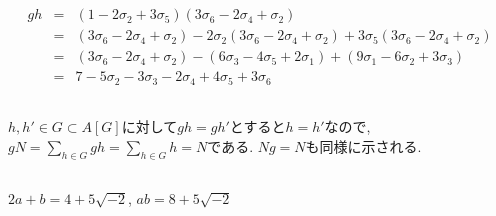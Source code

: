 \documentclass{jsarticle}
\begin{document}
\section{}

\subsection{} %
\begin{eqnarray*}
	gh 
	&=& (1 - 2\sigma_2 + 3\sigma_5)(3\sigma_6 - 2\sigma_4 + \sigma_2)\\
	&=& (3\sigma_6 - 2\sigma_4 + \sigma_2) - 2\sigma_2(3\sigma_6 - 2\sigma_4 + \sigma_2) + 3\sigma_5(3\sigma_6 - 2\sigma_4 + \sigma_2)\\
	&=& (3\sigma_6 - 2\sigma_4 + \sigma_2) - (6\sigma_3 - 4\sigma_5 + 2\sigma_1) + (9\sigma_1 - 6\sigma_2 + 3\sigma_3)\\
	&=& 7 - 5\sigma_2 - 3\sigma_3 - 2\sigma_4 + 4\sigma_5 + 3\sigma_6
\end{eqnarray*}

\subsection{} %
$h, h' \in G \subset A[G]$に対して$gh = gh'$とすると$h = h'$なので, $gN = \sum_{h \in G}gh = \sum_{h \in G}h = N$である. $Ng = N$も同様に示される.

\subsection{} %
$2a + b = 4 + 5\sqrt{-2}$, $ab = 8 + 5\sqrt{-2}$

\section{}
\subsection{} %


\subsection{} %
\subsection{} %
\subsection{} %
\end{document}
